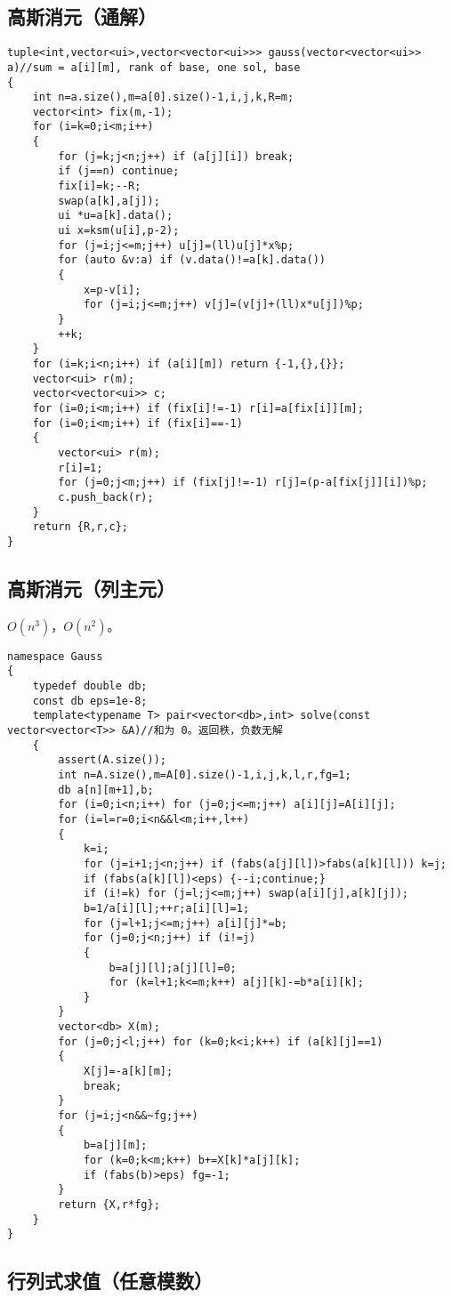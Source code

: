 \documentclass[12pt]{ctexart}
\begin{document}
\subsection{高斯消元（通解）}
\begin{lstlisting}
tuple<int,vector<ui>,vector<vector<ui>>> gauss(vector<vector<ui>> a)//sum = a[i][m], rank of base, one sol, base
{
	int n=a.size(),m=a[0].size()-1,i,j,k,R=m;
	vector<int> fix(m,-1);
	for (i=k=0;i<m;i++)
	{
		for (j=k;j<n;j++) if (a[j][i]) break;
		if (j==n) continue;
		fix[i]=k;--R;
		swap(a[k],a[j]);
		ui *u=a[k].data();
		ui x=ksm(u[i],p-2);
		for (j=i;j<=m;j++) u[j]=(ll)u[j]*x%p;
		for (auto &v:a) if (v.data()!=a[k].data())
		{
			x=p-v[i];
			for (j=i;j<=m;j++) v[j]=(v[j]+(ll)x*u[j])%p;
		}
		++k;
	}
	for (i=k;i<n;i++) if (a[i][m]) return {-1,{},{}};
	vector<ui> r(m);
	vector<vector<ui>> c;
	for (i=0;i<m;i++) if (fix[i]!=-1) r[i]=a[fix[i]][m];
	for (i=0;i<m;i++) if (fix[i]==-1)
	{
		vector<ui> r(m);
		r[i]=1;
		for (j=0;j<m;j++) if (fix[j]!=-1) r[j]=(p-a[fix[j]][i])%p;
		c.push_back(r);
	}
	return {R,r,c};
}
\end{lstlisting}

\subsection{高斯消元（列主元）}

$O(n^3)$，$O(n^2)$。

\begin{lstlisting}
namespace Gauss
{
	typedef double db;
	const db eps=1e-8;
	template<typename T> pair<vector<db>,int> solve(const vector<vector<T>> &A)//和为 0。返回秩，负数无解
	{
		assert(A.size());
		int n=A.size(),m=A[0].size()-1,i,j,k,l,r,fg=1;
		db a[n][m+1],b;
		for (i=0;i<n;i++) for (j=0;j<=m;j++) a[i][j]=A[i][j];
		for (i=l=r=0;i<n&&l<m;i++,l++)
		{
			k=i;
			for (j=i+1;j<n;j++) if (fabs(a[j][l])>fabs(a[k][l])) k=j;
			if (fabs(a[k][l])<eps) {--i;continue;}
			if (i!=k) for (j=l;j<=m;j++) swap(a[i][j],a[k][j]);
			b=1/a[i][l];++r;a[i][l]=1;
			for (j=l+1;j<=m;j++) a[i][j]*=b;
			for (j=0;j<n;j++) if (i!=j)
			{
				b=a[j][l];a[j][l]=0;
				for (k=l+1;k<=m;k++) a[j][k]-=b*a[i][k];
			}
		}
		vector<db> X(m);
		for (j=0;j<l;j++) for (k=0;k<i;k++) if (a[k][j]==1)
		{
			X[j]=-a[k][m];
			break;
		}
		for (j=i;j<n&&~fg;j++)
		{
			b=a[j][m];
			for (k=0;k<m;k++) b+=X[k]*a[j][k];
			if (fabs(b)>eps) fg=-1;
		}
		return {X,r*fg};
	}
}
\end{lstlisting}

\subsection{行列式求值（任意模数）}
\end{document}
